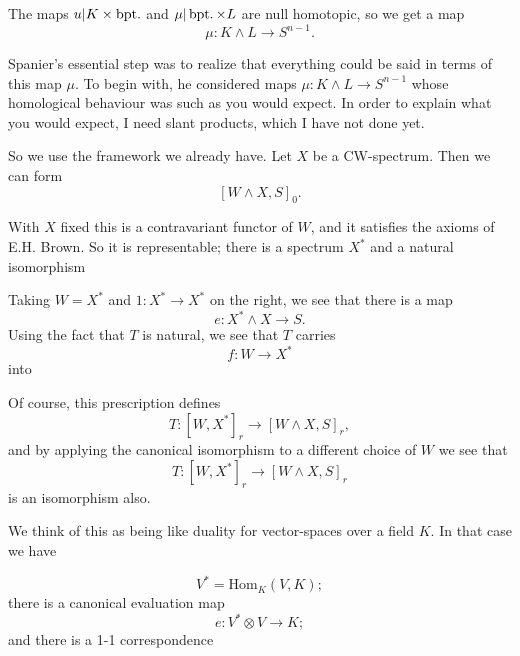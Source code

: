 \documentclass[../main]{subfiles}
\begin{document}
The maps $u\vert K\times\mathop{\mathrm{bpt.}}$ and $\mu\vert\mathop{\mathrm{bpt.}}\times L$ are null homotopic, so we get a map $$\mu\colon K\wedge L\longrightarrow S^{n-1}.$$

Spanier's essential step was to realize that everything could be said in terms of this map $\mu$. To begin with, he considered maps $\mu\colon K\wedge L\longrightarrow S^{n-1}$ whose homological behaviour was such as you would expect. In order to explain what you would expect, I need slant products, which I have not done yet.

So we use the framework we already have. Let $X$ be a CW-spectrum. Then we can form $$[W\wedge X,S]_0.$$

With $X$ fixed this is a contravariant functor of $W$, and it satisfies the axioms of E.H. Brown. So it is representable; there is a spectrum $X^{\ast}$ and a natural isomorphism 
\begin{center}
\end{center}
Taking $W=X^{\ast}$ and $1\colon X^{\ast}\longrightarrow X^{\ast}$ on the right, we see that there is a map $$e\colon X^{\ast}\wedge X\longrightarrow S.$$Using the fact that $T$ is natural, we see that $T$ carries $$f\colon W\longrightarrow X^{\ast}$$into

\begin{center}
\end{center}
Of course, this prescription defines $$T\colon [W,X^{\ast}]_r\longrightarrow[W\wedge X,S]_r,$$and by applying the canonical isomorphism to a different choice of $W$ we see that $$T\colon [W,X^{\ast}]_r\longrightarrow[W\wedge X,S]_r$$is an isomorphism also.

We think of this as being like duality for vector-spaces over a field $K$. In that case we have 

\begin{equation*}
    V^{\ast}=\mathrm{Hom}_K(V,K);
\end{equation*}
there is a canonical evaluation map $$e\colon V^{\ast}\otimes V\longrightarrow K;$$
and there is a 1-1 correspondence 
\begin{center}
\end{center}
\end{document}
